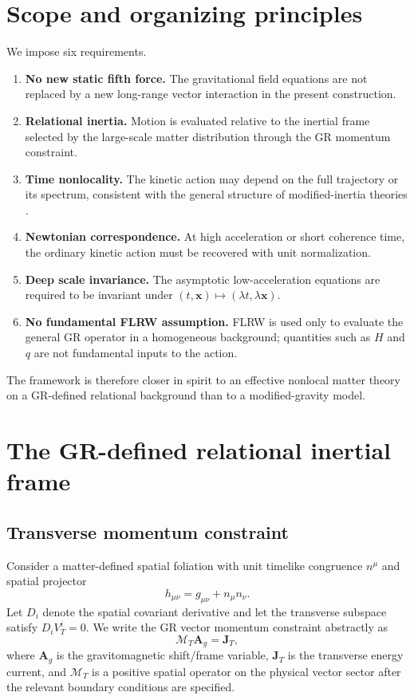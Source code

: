 \documentclass[11pt]{article}
\newcommand{\MT}{\mathcal{M}_{T}}
\begin{document}
\section{Scope and organizing principles}

We impose six requirements.

\begin{enumerate}[label=(\roman*)]
    \item \textbf{No new static fifth force.} The gravitational field equations are not replaced by a new long-range vector interaction in the present construction.
    \item \textbf{Relational inertia.} Motion is evaluated relative to the inertial frame selected by the large-scale matter distribution through the GR momentum constraint.
    \item \textbf{Time nonlocality.} The kinetic action may depend on the full trajectory or its spectrum, consistent with the general structure of modified-inertia theories \cite{Milgrom1994}.
    \item \textbf{Newtonian correspondence.} At high acceleration or short coherence time, the ordinary kinetic action must be recovered with unit normalization.
    \item \textbf{Deep scale invariance.} The asymptotic low-acceleration equations are required to be invariant under $(t,\bm{x})\mapsto(\lambda t,\lambda\bm{x})$.
    \item \textbf{No fundamental FLRW assumption.} FLRW is used only to evaluate the general GR operator in a homogeneous background; quantities such as $H$ and $q$ are not fundamental inputs to the action.
\end{enumerate}

The framework is therefore closer in spirit to an effective nonlocal matter theory on a GR-defined relational background than to a modified-gravity model.

\section{The GR-defined relational inertial frame}

\subsection{Transverse momentum constraint}

Consider a matter-defined spatial foliation with unit timelike congruence $n^\mu$ and spatial projector
\begin{equation}
    h_{\mu\nu}=g_{\mu\nu}+n_\mu n_\nu.
\end{equation}
Let $D_i$ denote the spatial covariant derivative and let the transverse subspace satisfy $D_i V_T^i=0$. We write the GR vector momentum constraint abstractly as
\begin{equation}
    \MT \bm{A}_g = \bm{J}_{T},
    \label{eq:MTabstract}
\end{equation}
where $\bm{A}_g$ is the gravitomagnetic shift/frame variable, $\bm{J}_T$ is the transverse energy current, and $\MT$ is a positive spatial operator on the physical vector sector after the relevant boundary conditions are specified.
\end{document}
